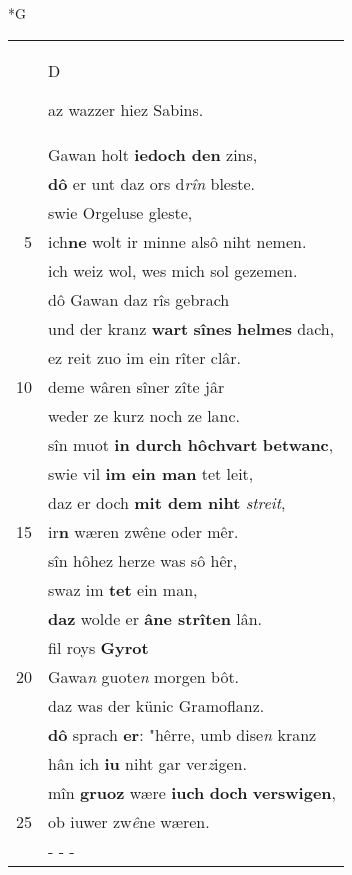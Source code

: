 \documentclass[8pt,a4paper,notitlepage]{article}
\begin{document}
\newpage
\begin{table}[ht]
\begin{minipage}[t]{0.5\linewidth}
\small
\begin{center}*G
\end{center}
\begin{tabular}{rl}
 & \begin{large}D\end{large}az wazzer hiez Sabins.\\ 
 & Gawan holt \textbf{iedoch den} zins,\\ 
 & \textbf{dô} er unt daz ors d\textit{rîn} bleste.\\ 
 & swie Orgeluse gleste,\\ 
5 & ich\textbf{ne} wolt ir minne alsô niht nemen.\\ 
 & ich weiz wol, wes mich sol gezemen.\\ 
 & dô Gawan daz rîs gebrach\\ 
 & und der kranz \textbf{wart} \textbf{sînes} \textbf{helmes} dach,\\ 
 & ez reit zuo im ein rîter clâr.\\ 
10 & deme wâren sîner zîte jâr\\ 
 & weder ze kurz noch ze lanc.\\ 
 & sîn muot \textbf{in durch hôchvart} \textbf{betwanc},\\ 
 & swie vil \textbf{im ein man} tet leit,\\ 
 & daz er doch \textbf{mit dem niht} \textit{streit},\\ 
15 & ir\textbf{n} wæren zwêne oder mêr.\\ 
 & sîn hôhez herze was sô hêr,\\ 
 & swaz im \textbf{tet} ein man,\\ 
 & \textbf{daz} wolde er \textbf{âne strîten} lân.\\ 
 & fil roys \textbf{Gyrot}\\ 
20 & Gawa\textit{n} guote\textit{n} morgen bôt.\\ 
 & daz was der künic Gramoflanz.\\ 
 & \textbf{dô} sprach \textbf{er}: "hêrre, umb dise\textit{n} kranz\\ 
 & hân ich \textbf{iu} niht gar ver\textit{z}igen.\\ 
 & mîn \textbf{gruoz} wære \textbf{iuch} \textbf{doch} \textbf{verswigen},\\ 
25 & ob iuwer zw\textit{ê}ne wæren.\\ 
 & \multicolumn{1}{l}{ - - - }\\ 

\end{tabular}
\end{minipage}
\end{table}
\end{document}
